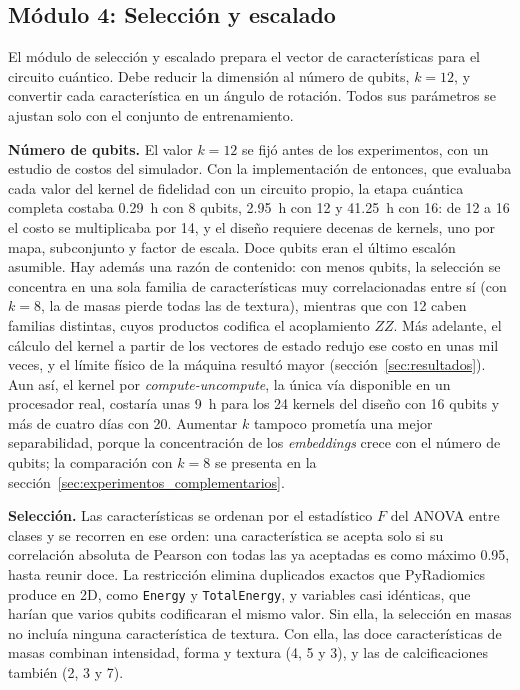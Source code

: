 
\subsection{Módulo 4: Selección y escalado}
\label{sec:modulo4}

El módulo de selección y escalado prepara el vector de características para el circuito cuántico.
Debe reducir la dimensión al número de qubits, $k = 12$, y convertir cada característica en un
ángulo de rotación. Todos sus parámetros se ajustan solo con el conjunto de entrenamiento.

\textbf{Número de qubits.} El valor $k = 12$ se fijó antes de los experimentos, con un estudio de
costos del simulador. Con la implementación de entonces, que evaluaba cada valor del kernel de
fidelidad con un circuito propio, la etapa cuántica completa costaba 0.29~h con 8 qubits, 2.95~h con
12 y 41.25~h con 16: de 12 a 16 el costo se multiplicaba por 14, y el diseño requiere decenas de
kernels, uno por mapa, subconjunto y factor de escala. Doce qubits eran el último escalón asumible.
Hay además una razón de contenido: con menos qubits, la selección se concentra en una sola familia de
características muy correlacionadas entre sí (con $k = 8$, la de masas pierde todas las de textura),
mientras que con 12 caben familias distintas, cuyos productos codifica el acoplamiento $ZZ$. Más adelante, el cálculo del
kernel a partir de los vectores de estado redujo ese costo en unas mil veces, y el límite físico de la
máquina resultó mayor (sección~\ref{sec:resultados}). Aun así, el kernel por
\textit{compute-uncompute}, la única vía disponible en un procesador real, costaría unas 9~h para los
24 kernels del diseño con 16 qubits y más de cuatro días con 20. Aumentar $k$ tampoco prometía una
mejor separabilidad, porque la concentración de los \textit{embeddings} crece con el número de qubits;
la comparación con $k = 8$ se presenta en la sección~\ref{sec:experimentos_complementarios}.

\textbf{Selección.} Las características se ordenan por el estadístico $F$ del ANOVA entre clases y
se recorren en ese orden: una característica se acepta solo si su correlación absoluta de Pearson
con todas las ya aceptadas es como máximo 0.95, hasta reunir doce. La restricción elimina
duplicados exactos que PyRadiomics produce en 2D, como \texttt{Energy} y \texttt{TotalEnergy}, y
variables casi idénticas, que harían que varios qubits codificaran el mismo valor. Sin ella, la
selección en masas no incluía ninguna característica de textura. Con ella, las doce características
de masas combinan intensidad, forma y textura (4, 5 y 3), y las de calcificaciones también (2, 3 y 7).

